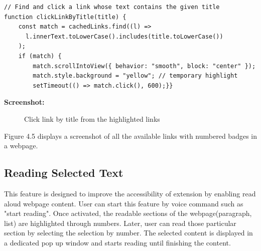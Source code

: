 \vspace{1in}

\begin{verbatim}
// Find and click a link whose text contains the given title
function clickLinkByTitle(title) {
    const match = cachedLinks.find((l) =>
      l.innerText.toLowerCase().includes(title.toLowerCase())
    );
    if (match) {
        match.scrollIntoView({ behavior: "smooth", block: "center" });
        match.style.background = "yellow"; // temporary highlight
        setTimeout(() => match.click(), 600);}}
\end{verbatim}


\textbf{Screenshot:}

\begin{figure}[htbp] 
    \centering
    \caption{Click link by title from the highlighted links}
    \label{fig:click_highlight_links}
\end{figure}

Figure 4.5 displays a screenshot of all the available links with numbered badges in a webpage. 

\subsection{Reading Selected Text}
This feature is designed to improve the accessibility of extension by enabling read aloud webpage content. User can start this feature by voice command such as "start reading". Once activated, the readable sections of the webpage(paragraph, list) are highlighted through numbers.
Later, user can read those particular section by selecting the selection by number. The selected content is displayed in a dedicated pop up window and starts reading until finishing the content.
